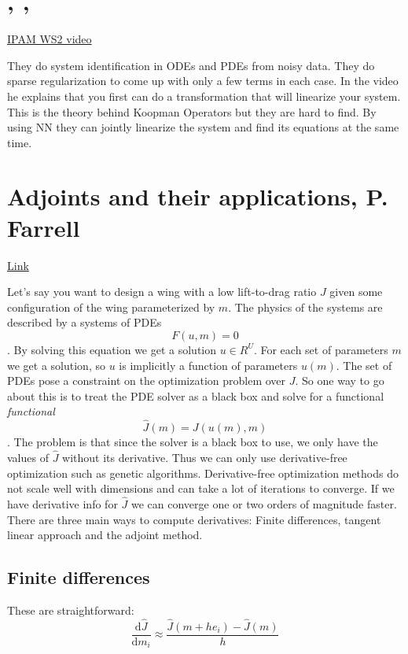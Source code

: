 \documentclass{article}
\newcommand{\citeall}[1]{\citeauthor{#1}, \citetitle{#1}, \citeyear{#1}}
\begin{document}
\section{\citeall{Brunton2016DiscoveringSystems}}

\href{http://www.ipam.ucla.edu/abstract/?tid=15783&pcode=MLPWS2}{IPAM WS2 video}

They do system identification in ODEs and PDEs from noisy data. They do sparse regularization to come up with only a few terms in each case. In the video he explains that you first can do a transformation that will linearize your system. This is the theory behind Koopman Operators but they are hard to find. By using NN they can jointly linearize the system and find its equations at the same time. 

\section{Adjoints and their applications, P. Farrell}

\href{dolfin-adjoint.org/en/latest/documentation/maths/index.html}{Link}

Let's say you want to design a wing with a low lift-to-drag ratio $J$ given some configuration of the wing parameterized by $m$. The physics of the systems are described by a systems of PDEs $$F(u,m)=0$$. By solving this equation we get a solution $u \in R^U$. For each set of parameters $m$ we get a solution, so $u$ is implicitly a function of parameters $u(m)$. The set of PDEs pose a constraint on the optimization problem over $J$. So one way to go about this is to treat the PDE solver as a black box and solve for a functional \textit{functional} $$\widehat{J}(m)=J(u(m),m)$$. The problem is that since the solver is a black box to use, we only have the values of $\widehat{J}$ without its derivative. Thus we can only use derivative-free optimization such as genetic algorithms. Derivative-free optimization methods do not scale well with dimensions and can take a lot of iterations to converge. If we have derivative info for $\widehat{J}$ we can converge one or two orders of magnitude faster. There are three main ways to compute derivatives: Finite differences, tangent linear approach and the adjoint method.

\subsection{Finite differences }
These are straightforward: 
$$
\frac{\mathrm{d} \widehat{J}}{\mathrm{d} m_{i}} \approx \frac{\widehat{J}\left(m+h e_{i}\right)-\widehat{J}(m)}{h}
$$
\end{document}
